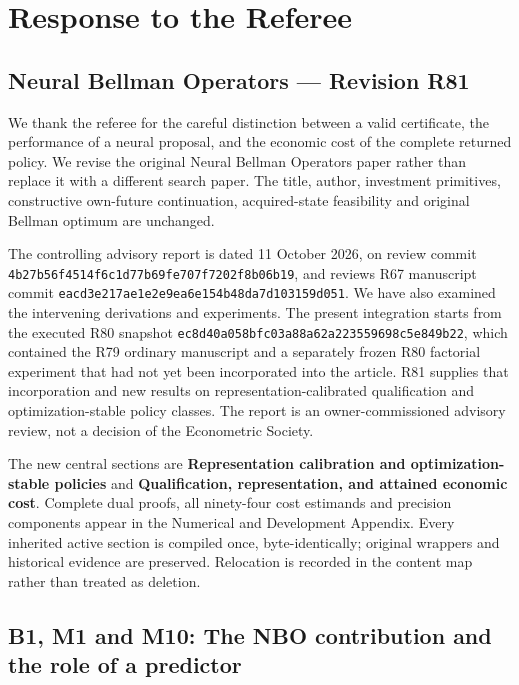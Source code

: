 \hypertarget{response-to-the-referee}{%
\section{Response to the Referee}\label{response-to-the-referee}}

\hypertarget{neural-bellman-operators-revision-r81}{%
\subsection{Neural Bellman Operators --- Revision
R81}\label{neural-bellman-operators-revision-r81}}

We thank the referee for the careful distinction between a valid
certificate, the performance of a neural proposal, and the economic cost
of the complete returned policy. We revise the original Neural Bellman
Operators paper rather than replace it with a different search paper.
The title, author, investment primitives, constructive own-future
continuation, acquired-state feasibility and original Bellman optimum
are unchanged.

The controlling advisory report is dated 11 October 2026, on review
commit \texttt{4b27b56f4514f6c1d77b69fe707f7202f8b06b19}, and reviews
R67 manuscript commit \texttt{eacd3e217ae1e2e9ea6e154b48da7d103159d051}.
We have also examined the intervening derivations and experiments. The
present integration starts from the executed R80 snapshot
\texttt{ec8d40a058bfc03a88a62a223559698c5e849b22}, which contained the
R79 ordinary manuscript and a separately frozen R80 factorial experiment
that had not yet been incorporated into the article. R81 supplies that
incorporation and new results on representation-calibrated qualification
and optimization-stable policy classes. The report is an
owner-commissioned advisory review, not a decision of the Econometric
Society.

The new central sections are \textbf{Representation calibration and
optimization-stable policies} and \textbf{Qualification, representation,
and attained economic cost}. Complete dual proofs, all ninety-four cost
estimands and precision components appear in the Numerical and
Development Appendix. Every inherited active section is compiled once,
byte-identically; original wrappers and historical evidence are
preserved. Relocation is recorded in the content map rather than treated
as deletion.

\hypertarget{b1-m1-and-m10-the-nbo-contribution-and-the-role-of-a-predictor}{%
\subsection{B1, M1 and M10: The NBO contribution and the role of a
predictor}\label{b1-m1-and-m10-the-nbo-contribution-and-the-role-of-a-predictor}}

